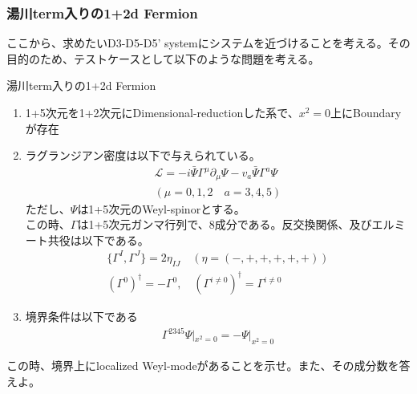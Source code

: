 \documentclass[dvipdfmx,a4paper,10.5pt]{article}
\numberwithin{equation}{section}
\begin{document}
\subsubsection{湯川term入りの1+2d Fermion}
ここから、求めたいD3-D5-D5' systemにシステムを近づけることを考える。その目的のため、テストケースとして以下のような問題を考える。
\begin{problembox}{湯川term入りの1+2d Fermion}
    \begin{enumerate}
        \item 1+5次元を1+2次元にDimensional-reductionした系で、$x^{2}=0$上にBoundaryが存在
        \item ラグランジアン密度は以下で与えられている。
        \begin{gather*}
            \mathcal{L}=-i\bar{\Psi}\Gamma^{\mu}\partial_{\mu}\Psi-v_{a}\bar{\Psi}\Gamma^{a}\Psi\\
            (\mu=0,1,2\quad a=3,4,5)
        \end{gather*}
        ただし、$\Psi$は1+5次元のWeyl-spinorとする。\\
        この時、$\Gamma$は1+5次元ガンマ行列で、8成分である。反交換関係、及びエルミート共役は以下である。
        \begin{gather*}
            \{\Gamma^{I},\Gamma^{J}\}=2\eta_{IJ}\quad (\eta=(-,+,+,+,+,+))\\
            (\Gamma^{0})^{\dagger}=-\Gamma^{0},\quad (\Gamma^{i\neq 0})^{\dagger}=\Gamma^{i\neq 0}
        \end{gather*}
        \item 境界条件は以下である
        \begin{align*}
            \Gamma^{2345}\Psi|_{x^{2}=0}=-\Psi|_{x^{2}=0}
        \end{align*}
    \end{enumerate}
    この時、境界上にlocalized Weyl-modeがあることを示せ。また、その成分数を答えよ。
\end{problembox}
\end{document}

